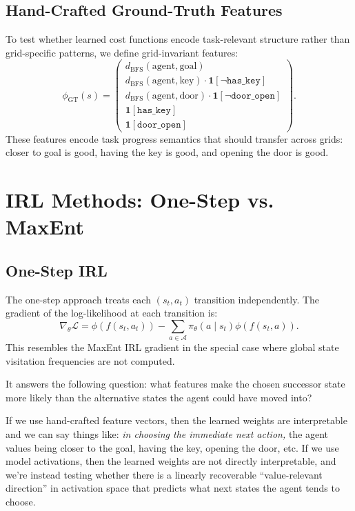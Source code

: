 \documentclass[11pt,a4paper]{article}
\newcommand{\A}{\mathcal{A}}
\begin{document}
\subsection{Hand-Crafted Ground-Truth Features}

To test whether learned cost functions encode task-relevant structure rather than grid-specific patterns, we define grid-invariant features:
\[
\phi_{\mathrm{GT}}(s)=
\begin{pmatrix}
 d_{\mathrm{BFS}}(\mathrm{agent},\mathrm{goal})\\
 d_{\mathrm{BFS}}(\mathrm{agent},\mathrm{key})\cdot\mathbf{1}[\neg\texttt{has\_key}]\\
 d_{\mathrm{BFS}}(\mathrm{agent},\mathrm{door})\cdot\mathbf{1}[\neg\texttt{door\_open}]\\
 \mathbf{1}[\texttt{has\_key}]\\
 \mathbf{1}[\texttt{door\_open}]
\end{pmatrix}.
\]
These features encode task progress semantics that should transfer across grids: closer to goal is good, having the key is good, and opening the door is good.

\section{IRL Methods: One-Step vs. MaxEnt}

\subsection{One-Step IRL}

The one-step approach treats each $(s_t,a_t)$ transition independently. The gradient of the log-likelihood at each transition is:
\[
\nabla_\theta \mathcal{L}=\phi(f(s_t,a_t))-\sum_{a\in\A}\pi_\theta(a\mid s_t)\phi(f(s_t,a)).
\]
This resembles the MaxEnt IRL gradient in the special case where global state visitation frequencies are not computed. 
{\color{blue}
It answers the following question: what features make the chosen successor state more likely than the alternative states the agent could have moved into?

If we use hand-crafted feature vectors, then the learned weights are interpretable and we can say things like: \textit{in choosing the immediate next action,} the agent values being closer to the goal, having the key, opening the door, etc. If we use model activations, then the learned weights are not directly interpretable, and we're instead testing whether there is a linearly recoverable ``value-relevant direction'' in activation space that predicts what next states the agent tends to choose.
}
\end{document}
